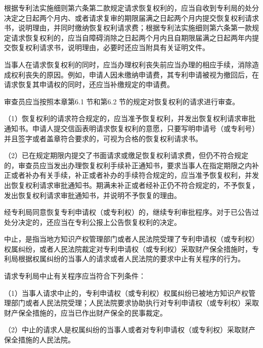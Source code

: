 根据专利法实施细则第六条第二款规定请求恢复权利的，应当自收到专利局的处分决定之日起两个月内、或者请求复审的期限届满之日起两个月内提交恢复权利请求书，说明理由，并同时缴纳恢复权利请求费；根据专利法实施细则第六条第一款规定请求恢复权利的，应当自障碍消除之日起两个月内且自期限届满之日起两年内提交恢复权利请求书，说明理由，必要时还应当附具有关证明文件。

当事人在请求恢复权利的同时，应当办理权利丧失前应当办理的相应手续，消除造成权利丧失的原因。例如，申请人因未缴纳申请费，其专利申请被视为撤回后，在请求恢复其申请权的同时，还应当补缴规定的申请费。

审查员应当按照本章第6.1 节和第6.2 节的规定对恢复权利的请求进行审查。

{\setlength{\parindent}{17.1bp}（1）恢复权利的请求符合规定的，应当准予恢复权利，并发出恢复权利请求审批通知书。申请人提交信函表明请求恢复权利的意愿，只要写明申请号（或专利号）并且签字或者盖章符合要求的，可视为合格的恢复权利请求书。\par}

{\setlength{\parindent}{17.1bp}（2）已在规定期限内提交了书面请求或缴足恢复权利请求费，但仍不符合规定的，审查员应当发出办理恢复权利手续补正通知书，要求当事人在指定期限之内补正或者补办有关手续，补正或者补办的手续符合规定的，应当准予恢复权利，并发出恢复权利请求审批通知书。期满未补正或者经补正仍不符合规定的，不予恢复，发出恢复权利请求审批通知书，并说明不予恢复的理由。\par}

经专利局同意恢复专利申请权（或专利权）的，继续专利审批程序。对于已公告过处分决定的，还应当在专利公报上公告恢复权利的决定。

中止，是指当地方知识产权管理部门或者人民法院受理了专利申请权（或专利权）权属纠纷，或者人民法院裁定对专利申请权（或专利权）采取财产保全措施时，专利局根据权属纠纷的当事人的请求或者人民法院的要求中止有关程序的行为。

请求专利局中止有关程序应当符合下列条件：

{\setlength{\parindent}{17.1bp}（1）当事人请求中止的，专利申请权（或专利权）权属纠纷已被地方知识产权管理部门或者人民法院受理；人民法院要求协助执行对专利申请权（或专利权）采取财产保全措施的，应当已作出财产保全的民事裁定。\par}

{\setlength{\parindent}{17.1bp}（2）中止的请求人是权属纠纷的当事人或者对专利申请权（或专利权）采取财产保全措施的人民法院。\par}

